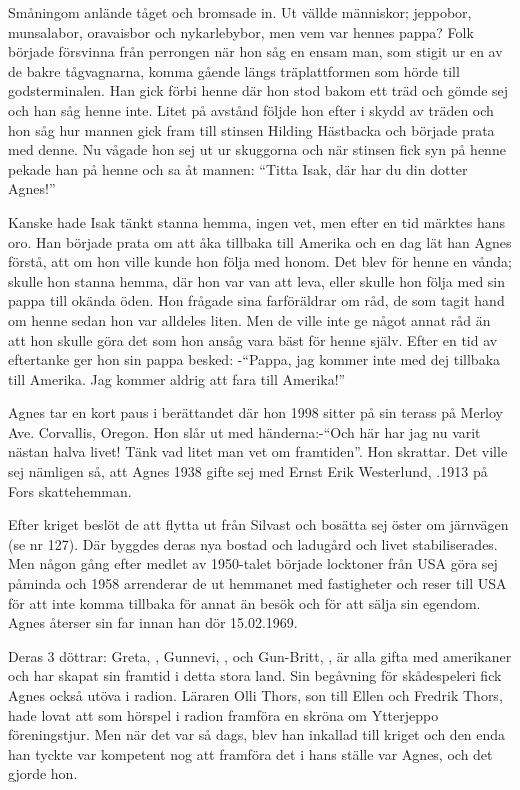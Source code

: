 Småningom anlände tåget och bromsade in. Ut vällde människor; jeppobor, munsalabor, oravaisbor och nykarlebybor, men vem var hennes pappa? Folk började försvinna från perrongen när hon såg en ensam man, som stigit ur en av de bakre tågvagnarna, komma gående längs träplattformen som hörde till godsterminalen. Han gick förbi henne där hon stod bakom ett träd och gömde sej och han såg henne inte. Litet på avstånd följde hon efter i skydd av träden och hon såg hur mannen gick fram till stinsen Hilding Hästbacka och började prata med denne. Nu vågade hon sej ut ur skuggorna och när stinsen fick syn på henne pekade han på henne och sa åt mannen: ``Titta Isak, där har du din dotter Agnes!''

Kanske hade Isak tänkt stanna hemma, ingen vet, men efter en tid märktes hans oro. Han började prata om att åka tillbaka till Amerika och en dag lät han Agnes förstå, att om hon ville kunde hon följa med honom. Det blev för henne en vånda; skulle hon stanna hemma, där hon var van att leva, eller skulle hon följa med sin pappa till okända öden. Hon frågade sina farföräldrar om råd, de som tagit hand om henne sedan hon var alldeles liten. Men de ville inte ge något annat råd än att hon skulle göra det som hon  ansåg vara bäst för henne själv. Efter en tid av eftertanke ger hon sin pappa besked: -``Pappa, jag kommer inte med dej tillbaka till Amerika. Jag kommer aldrig att fara till Amerika!''

Agnes tar en kort paus i berättandet där hon 1998 sitter på sin terass på Merloy Ave. Corvallis, Oregon. Hon slår ut med händerna:-``Och här har jag nu varit nästan halva livet! Tänk vad litet man vet om framtiden''. Hon skrattar. Det ville sej nämligen så, att Agnes 1938 gifte sej med Ernst Erik Westerlund, .1913 på Fors skattehemman.

Efter kriget beslöt de att flytta ut från Silvast och bosätta sej öster om järnvägen (se nr 127). Där byggdes deras nya bostad och ladugård och livet stabiliserades. Men någon gång efter medlet av 1950-talet började locktoner från USA göra sej påminda och 1958 arrenderar de ut hemmanet med fastigheter och reser till USA för att inte komma tillbaka för annat än besök och för att sälja sin egendom. Agnes återser sin far innan han dör 15.02.1969.

Deras 3 döttrar: Greta, , Gunnevi, , och Gun-Britt, , är alla gifta med amerikaner och har skapat sin framtid i detta stora land. Sin begåvning för skådespeleri fick Agnes också utöva i radion. Läraren Olli Thors, son till Ellen och Fredrik Thors, hade lovat att som hörspel i radion framföra en skröna om Ytterjeppo föreningstjur. Men när det var så dags, blev han inkallad till kriget och den enda han tyckte var kompetent nog att framföra det i hans ställe var Agnes, och det gjorde hon.

